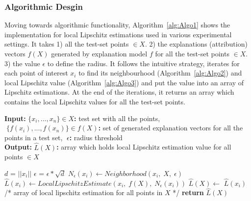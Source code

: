 \documentclass[english]{tktltiki2}
\theoremstyle{definition}
\theoremstyle{remark}
\newcommand{\multicommentsymbolstart}{/*}
\newcommand{\multicommentsymbolend}{*/}
\newcommand{\MultiLineComment}[2][\algorithmicindent]{\Statex \hspace{#1}\multicommentsymbolstart{} #2 \multicommentsymbolend{}}
\newcommand{\onespace}{\;}
\begin{document}
\subsubsection{Algorithmic Desgin}\label{sec:algorithmic_desgin} %
Moving towards algorithmic functionality, Algorithm~\ref{alg:Algo1} shows the implementation for local Lipschitz estimations used in various experimental settings. It takes 1) all the test-set points $ \in X$. 2) the explanations (attribution) vectors $f(X)$ generated by explanation model $f$  for all the test-set points $\in X$. 3) the value $\epsilon$ to define the radius.  It follows the intuitive strategy, iterates for each point of interest $x_i$ to find its neighbourhood (Algorithm~\ref{alg:Algo2}) and local Lipschitz value (Algorithm~\ref{alg:Algo3}) and put the value into an array of Lipschitz estimations. At the end of the iterations, it returns an array which contains the local Lipschitz values for all the test-set points.
\begin{algorithm}[H]
	\caption{$LipschitzEstimations(X,\onespace f(X),\onespace \epsilon)$}
	\label{alg:Algo1}
	\hspace*{\algorithmicindent} \textbf{Input}\textbf{:} $\{x_i,...,x_n\} \in X$\textbf{:} test set with all the points, $\onespace \{f(x_i),...,f(x_n)\} \in f(X)$\textbf{:} set of generated explanation vectors for all the points in a test set, $\onespace \epsilon$\textbf{:} radius threshold \\
	\hspace*{\algorithmicindent} \textbf{Output}\textbf{:} $\hat{L}(X)$\textbf{:} array which holds local Lipschitz estimation value for all points $\in X$ 
	\begin{algorithmic}[1]
		\State $d$ = $||x_i||$
		\State $\epsilon$ = $\epsilon * \sqrt{d}$ 
		\State $N_{\epsilon}(x_i) \gets Neighborhood(x_i,\; X,\; \epsilon)$
		\State $\hat{L}(x_{i}) \gets LocalLipschitzEstimate(x_i,\; f(X),\; N_\epsilon(x_i))$
		\State $\hat{L}(X) \gets$ $\hat{L}(x_i)$
		\EndFor
		\MultiLineComment[0\dimexpr\algorithmicindent]{array of local lipschitz estimation for all points in $X$}
		\State \textbf{return} $\hat{L}(X)$
	\end{algorithmic}
\end{algorithm}
\end{document}
